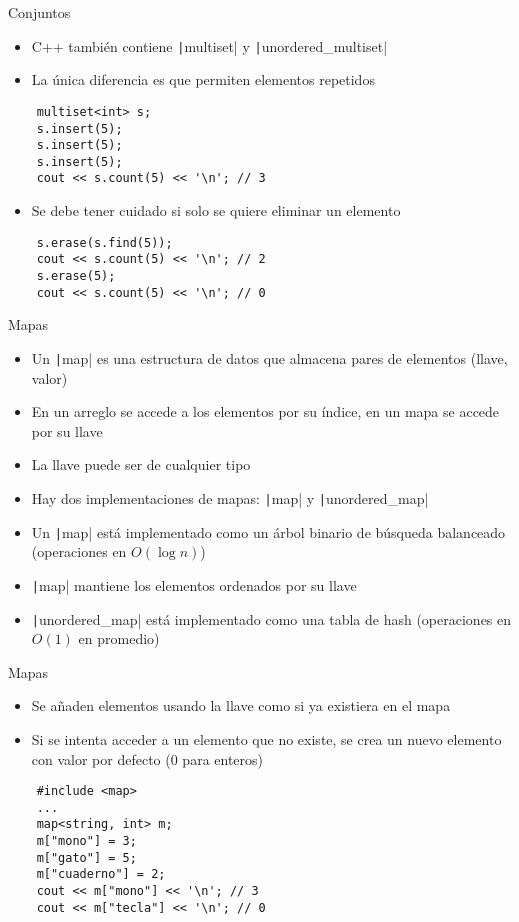 \documentclass[10pt]{beamer}
\newcommand{\bi}{\begin{itemize}}
\newcommand{\ei}{\end{itemize}}
\begin{document}
\begin{frame}[fragile]{Conjuntos}
  \bi
    \item C++ también contiene \texttt|multiset| y \texttt|unordered_multiset|
    \item La única diferencia es que permiten elementos repetidos
  \ei
  \begin{verbatim}
    multiset<int> s;
    s.insert(5);
    s.insert(5);
    s.insert(5);
    cout << s.count(5) << '\n'; // 3
  \end{verbatim}
  \bi
    \item Se debe tener cuidado si solo se quiere eliminar un elemento
  \ei
  \begin{verbatim}
    s.erase(s.find(5));
    cout << s.count(5) << '\n'; // 2
    s.erase(5);
    cout << s.count(5) << '\n'; // 0
  \end{verbatim}
\end{frame}

\begin{frame}[fragile]{Mapas}
  \bi
    \item Un \texttt|map| es una estructura de datos que almacena pares de elementos (llave, valor)
    \item En un arreglo se accede a los elementos por su índice, en un mapa se accede por su llave
    \item La llave puede ser de cualquier tipo
    \item Hay dos implementaciones de mapas: \texttt|map| y \texttt|unordered_map|
    \item Un \texttt|map| está implementado como un árbol binario de búsqueda balanceado (operaciones en $O(\log n)$)
    \item \texttt|map| mantiene los elementos ordenados por su llave
    \item \texttt|unordered_map| está implementado como una tabla de hash (operaciones en $O(1)$ en promedio)
  \ei
\end{frame}

\begin{frame}[fragile]{Mapas}
  \bi
    \item Se añaden elementos usando la llave como si ya existiera en el mapa
    \item Si se intenta acceder a un elemento que no existe, se crea un nuevo elemento con valor por defecto (0 para enteros)
  \ei
  \begin{verbatim}
    #include <map>
    ...
    map<string, int> m;
    m["mono"] = 3;
    m["gato"] = 5;
    m["cuaderno"] = 2;
    cout << m["mono"] << '\n'; // 3
    cout << m["tecla"] << '\n'; // 0
  \end{verbatim}
\end{frame}
\end{document}
